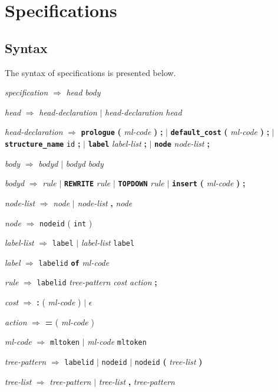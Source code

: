 \section{\mltwig Specifications}
\subsection{Syntax}

The syntax of \mltwig specifications is presented below.

\newenvironment{grammar}{\goodbreak\medskip\obeylines\parskip=1pt}{\medskip\goodbreak}
\newcommand{\NT}[1]{ {\em #1} }
\newcommand{\TE}[1]{ {\tt #1} }
\newcommand{\RW}[1]{ {\tt\bf #1} }
\newcommand{\IS}{ $\Rightarrow$ }
\newcommand{\OR}{ $|$ }
\newcommand{\EMPTY}{ $\epsilon$ }
\newcommand{\TAB}{ \hskip8mm }
\newcommand{\VTAB}{ \vskip3mm }
\newcommand{\LPA}{ {\bf (} }
\newcommand{\RPA}{ {\bf )} }
\newcommand{\COM}{ {\bf ,} }
\newcommand{\RBR}{ ${\bf ]}$ }
\newcommand{\LBR}{ ${\bf [}$ }
\newcommand{\SEC}{ {\bf ;} }
\newcommand{\COL}{ {\bf :} }
\newcommand{\EQ} { {\bf =} }

\begin{grammar}
\VTAB
\NT{specification}\IS\NT{head}\NT{body}
        
\NT{head}\IS\NT{head-declaration}\OR\NT{head-declaration}\NT{head}
        
\NT{head-declaration}\IS\RW{prologue}\LPA\NT{ml-code}\RPA\SEC
\TAB\OR\RW{default\_cost}\LPA \NT{ml-code}\RPA \SEC
\TAB\OR\RW{structure\_name}\TE{id} \SEC
\TAB\OR\RW{label}\NT{label-list}\SEC
\TAB\OR\RW{node}\NT{node-list}\SEC
        
\NT{body}\IS\NT{bodyd}\OR\NT{bodyd}\NT{body} 
        
\NT{bodyd}\IS\NT{rule}\OR\RW{REWRITE}\NT{rule}\OR\RW{TOPDOWN}\NT{rule}\OR\RW{insert}\LPA\NT{ml-code}\RPA\SEC

\VTAB

\NT{node-list}\IS\NT{node}\OR\NT{node-list}\COM\NT{node}

\NT{node}\IS\TE{nodeid}(\TE{int}) 

\NT{label-list}\IS\TE{label}\OR\NT{label-list}\TE{label}

\NT{label}\IS\TE{labelid}\RW{of}\NT{ml-code}

\VTAB
        
\NT{rule}\IS\TE{labelid}\NT{tree-pattern}\NT{cost}\NT{action}\SEC

\VTAB

\NT{cost}\IS\COL(\NT{ml-code})\OR\EMPTY
  
\NT{action}\IS\EQ(\NT{ml-code})

\NT{ml-code}\IS\TE{mltoken}\OR\NT{ml-code}\TE{mltoken}

\NT{tree-pattern}\IS\TE{labelid}\OR\TE{nodeid}\OR\TE{nodeid}\LPA\NT{tree-list} \RPA 
   
\NT{tree-list}\IS\NT{tree-pattern}\OR\NT{tree-list}\COM\NT{tree-pattern}

\VTAB
\end{grammar}

